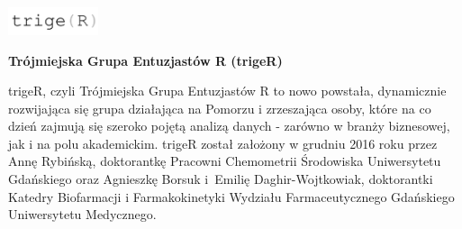 \documentclass[\main/boa.tex]{subfiles}
\begin{document}
	
	\begin{minipage}[t]{0.915\textwidth}
		\center     
		\includegraphics[width=100px]{img/logos.bw/triger3.png} 
	\end{minipage}
	\begin{center}
	\Large \textbf {Trójmiejska Grupa Entuzjastów R (trigeR)}
	\end{center}
	
	\vskip 0.3cm
	\normalsize 


trigeR, czyli Trójmiejska Grupa Entuzjastów R to nowo powstała, dynamicznie rozwijająca się grupa działająca na Pomorzu i zrzeszająca osoby, które na co dzień zajmują się szeroko pojętą analizą danych - zarówno w branży biznesowej, jak i na polu akademickim. trigeR został założony w grudniu 2016 roku przez Annę Rybińską, doktorantkę Pracowni Chemometrii Środowiska Uniwersytetu Gdańskiego oraz Agnieszkę Borsuk i~Emilię Daghir-Wojtkowiak, doktorantki Katedry Biofarmacji i Farmakokinetyki Wydziału Farmaceutycznego Gdańskiego Uniwersytetu Medycznego.
	
	\vskip 1.5cm
\end{document}
